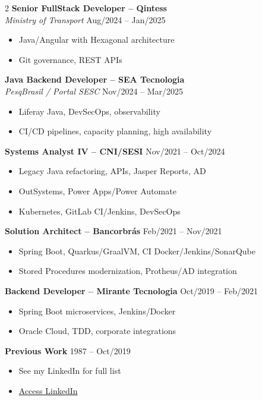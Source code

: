 \documentclass[a4paper,11pt]{article}
\begin{document}
\begin{paracol}{2}
\textbf{Senior FullStack Developer – Qintess} \\
\textit{Ministry of Transport}
\hfill Aug/2024 – Jan/2025
\begin{itemize}
    \item Java/Angular with Hexagonal architecture
    \item Git governance, REST APIs
\end{itemize}

\textbf{Java Backend Developer – SEA Tecnologia} \\
\textit{PesqBrasil / Portal SESC}
\hfill Nov/2024 – Mar/2025
\begin{itemize}
    \item Liferay Java, DevSecOps, observability
    \item CI/CD pipelines, capacity planning, high availability
\end{itemize}

\textbf{Systems Analyst IV – CNI/SESI} \hfill Nov/2021 – Oct/2024
\begin{itemize}
    \item Legacy Java refactoring, APIs, Jasper Reports, AD
    \item OutSystems, Power Apps/Power Automate
    \item Kubernetes, GitLab CI/Jenkins, DevSecOps
\end{itemize}

\textbf{Solution Architect – Bancorbrás} \hfill Feb/2021 – Nov/2021
\begin{itemize}
    \item Spring Boot, Quarkus/GraalVM, CI Docker/Jenkins/SonarQube
    \item Stored Procedures modernization, Protheus/AD integration
\end{itemize}

\textbf{Backend Developer – Mirante Tecnologia} \hfill Oct/2019 – Feb/2021
\begin{itemize}
    \item Spring Boot microservices, Jenkins/Docker
    \item Oracle Cloud, TDD, corporate integrations
\end{itemize}

\textbf{Previous Work} \hfill 1987 – Oct/2019
\begin{itemize}
	\item See my LinkedIn for full list
	\item \href{https://www.linkedin.com/in/fernando-anselmo-bb423623/}{Access LinkedIn}
\end{itemize}

\end{paracol}
\end{document}
